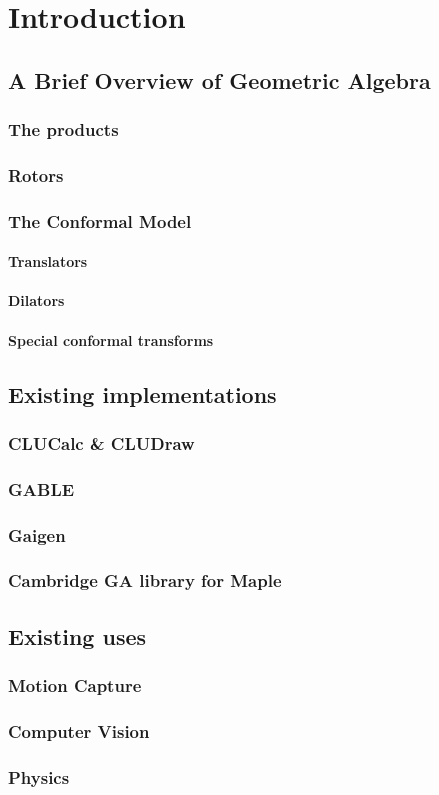 \chapter{Introduction}

\section{A Brief Overview of Geometric Algebra}

\subsection{The products}

\subsection{Rotors}

\subsection{The Conformal Model}

\subsubsection{Translators}
\subsubsection{Dilators}
\subsubsection{Special conformal transforms}

\section{Existing implementations}

\subsection{CLUCalc \& CLUDraw}
\subsection{GABLE}
\subsection{Gaigen}
\subsection{Cambridge GA library for Maple}

\section{Existing uses}

\subsection{Motion Capture}
\subsection{Computer Vision}
\subsection{Physics}
